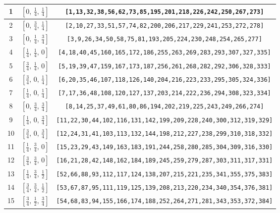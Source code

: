 \documentclass[fleqn,8pt]{jsarticle}
\begin{document}
\begin{longtable}{ccc}
1 & $\left[ 0,\, \frac{1}{4},\, \frac{1}{4} \right]$ & {\tt [1,13,32,38,56,62,73,85,195,201,218,226,242,250,267,273]} \\ \hline
2 & $\left[ 0,\, \frac{3}{4},\, \frac{1}{4} \right]$ & {\tt [2,10,27,33,51,57,74,82,200,206,217,229,241,253,272,278]} \\ \hline
3 & $\left[ 0,\, \frac{1}{4},\, \frac{3}{4} \right]$ & {\tt [3,9,26,34,50,58,75,81,193,205,224,230,248,254,265,277]} \\ \hline
4 & $\left[ \frac{1}{4},\, \frac{1}{4},\, 0 \right]$ & {\tt [4,18,40,45,160,165,172,186,255,263,269,283,293,307,327,335]} \\ \hline
5 & $\left[ \frac{3}{4},\, \frac{1}{4},\, 0 \right]$ & {\tt [5,19,39,47,159,167,173,187,256,261,268,282,292,306,328,333]} \\ \hline
6 & $\left[ \frac{3}{4},\, 0,\, \frac{1}{4} \right]$ & {\tt [6,20,35,46,107,118,126,140,204,216,223,233,295,305,324,336]} \\ \hline
7 & $\left[ \frac{1}{4},\, 0,\, \frac{1}{4} \right]$ & {\tt [7,17,36,48,108,120,127,137,203,214,222,236,294,308,323,334]} \\ \hline
8 & $\left[ 0,\, \frac{3}{4},\, \frac{3}{4} \right]$ & {\tt [8,14,25,37,49,61,80,86,194,202,219,225,243,249,266,274]} \\ \hline
9 & $\left[ \frac{1}{4},\, 0,\, \frac{3}{4} \right]$ & {\tt [11,22,30,44,102,116,131,142,199,209,228,240,300,312,319,329]} \\ \hline
10 & $\left[ \frac{3}{4},\, 0,\, \frac{3}{4} \right]$ & {\tt [12,24,31,41,103,113,132,144,198,212,227,238,299,310,318,332]} \\ \hline
11 & $\left[ \frac{1}{4},\, \frac{3}{4},\, 0 \right]$ & {\tt [15,23,29,43,149,163,183,191,244,258,280,285,304,309,316,330]} \\ \hline
12 & $\left[ \frac{3}{4},\, \frac{3}{4},\, 0 \right]$ & {\tt [16,21,28,42,148,162,184,189,245,259,279,287,303,311,317,331]} \\ \hline
13 & $\left[ \frac{1}{4},\, \frac{3}{4},\, \frac{1}{2} \right]$ & {\tt [52,66,88,93,112,117,124,138,207,215,221,235,341,355,375,383]} \\ \hline
14 & $\left[ \frac{3}{4},\, \frac{3}{4},\, \frac{1}{2} \right]$ & {\tt [53,67,87,95,111,119,125,139,208,213,220,234,340,354,376,381]} \\ \hline
15 & $\left[ \frac{3}{4},\, \frac{1}{2},\, \frac{3}{4} \right]$ & {\tt [54,68,83,94,155,166,174,188,252,264,271,281,343,353,372,384]} \\ \hline

\end{longtable}
\end{document}
